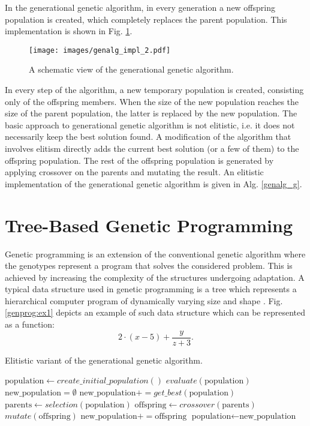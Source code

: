In the generational genetic algorithm, in every generation a new offspring population is created, which completely replaces the parent population.
This implementation is shown in Fig. \ref{genalg:impl_2}.
\begin{figure}[ht]
    \centering
    \texttt{[image: images/genalg\_impl\_2.pdf]}
    \caption{A schematic view of the generational genetic algorithm.}
    \label{genalg:impl_2}
\end{figure}
In every step of the algorithm, a new temporary population is created, consisting only of the offspring members.
When the size of the new population reaches the size of the parent population, the latter is replaced by the new population.
The basic approach to generational genetic algorithm is not elitistic, i.e. it does not necessarily keep the best solution found. 
A modification of the algorithm that involves elitism directly adds the current best solution (or a few of them) to the offspring population.
The rest of the offspring population is generated by applying crossover on the parents and mutating the result.
An elitistic implementation of the generational genetic algorithm is given in Alg.
 \ref{genalg_g}.

\section{Tree-Based Genetic Programming}
Genetic programming is an extension of the conventional genetic algorithm where the genotypes represent a program that solves the considered problem.
This is achieved by increasing the complexity of the structures undergoing adaptation.
A typical data structure used in genetic programming is a tree which represents a hierarchical computer program of dynamically varying size and shape \cite{koza1992genetic}.
Fig. \ref{genprog:ex1} depicts an example of such data structure which can be represented as a function:
\begin{equation*}
2 \cdot (x-5) + \frac{y}{z + 3}.
\end{equation*}

\begin{algorithm}[H]
\caption{Elitistic variant of the generational genetic algorithm.\label{genalg_g}}
\begin{algorithmic}[1]
\State $\text{population} \gets create\_initial\_population()$
\State $evaluate(\text{population})$
\State $\text{new\_population} = \emptyset$
\State $\text{new\_population} += get\_best(\text{population})$
\State $\text{parents} \gets selection(\text{population})$
\State $\text{offspring} \leftarrow crossover(\text{parents})$
\State $mutate(\text{offspring})$
\State $\text{new\_population} += \text{offspring}$
\EndWhile
\State $\text{population} \leftarrow \text{new\_population}$
\EndWhile
\end{algorithmic}
\end{algorithm}

